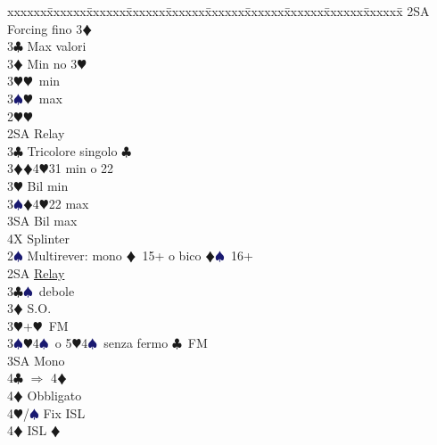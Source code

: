 \documentclass[a4paper,italian]{article}
\newcommand{\BC}{\textcolor{OliveGreen}{$\clubsuit$}}
\newcommand{\BD}{\textcolor{RedOrange}{$\vardiamondsuit$}}
\newcommand{\BH}{\textcolor{Red2}{$\varheartsuit${}}}
\newcommand{\BS}{\textcolor{MidnightBlue}{$\spadesuit${}}}
\newenvironment{bidtable}
{\begin{tabbing}

    xxxxxx\=xxxxxx\=xxxxxx\=xxxxxx\=xxxxxx\=xxxxxx\=xxxxxx\=xxxxxx\=xxxxxx\=xxxxxx\=\kill}
{\end{tabbing} }%
\begin{document}
\begin{multicols}{2}
\begin{bidtable}
                                            2SA \> Forcing fino 3\BD \+\\
                                            3\BC \> Max valori\\
                                            3\BD \> Min no 3\BH \\
                                            3\BH {}\BH\ min\\
                                            3\BS {}\BH\ max\-\-\\
                                            2\BH {}\BH \+\\
                                            2SA \> Relay\+\\
                                            3\BC \> Tricolore singolo \BC \\
                                            3\BD {}\BD 4\BH 31 min o 22\\
                                            3\BH \> Bil min\\
                                            3\BS {}\BD 4\BH 22 max\\
                                            3SA \> Bil max\\
                                            4X \> Splinter\-\-\\
                                            2\BS \> Multirever: mono \BD\ 15+ o bico \BD \BS\ 16+\+\\
                                            2SA \> \hyperref[multirever]{Relay}\\
                                            3\BC {}\BS\ debole\\
                                            3\BD \> S.O.\\
                                            3\BH {}+\BH\ FM\\
                                            3\BS {}\BH 4\BS\ o 5\BH 4\BS\ senza fermo \BC\ FM\+\\
                                            3SA \> Mono\\
                                            4\BC \> $\Rightarrow$ 4\BD \+\\
                                            4\BD \> Obbligato\+\\
                                            4\BH/\BS \> Fix ISL\-\-\\
                                            4\BD \> ISL \BD \-\-\\

\end{bidtable}
\end{multicols}
\end{document}
